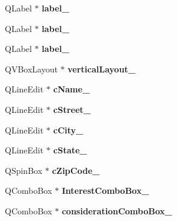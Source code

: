 \begin{DoxyCompactItemize}
Q\+Label $\ast$ {\bfseries label\+\_}
\item 
\mbox{\label{class_ui___main_window_ac1cbc41e9dbaeb3d0bdc2189d8e9ee1d}} 
Q\+Label $\ast$ {\bfseries label\+\_}
\item 
\mbox{\label{class_ui___main_window_a882200d8ae16962f5dd3b749ebacbf7e}} 
Q\+Label $\ast$ {\bfseries label\+\_}
\item 
\mbox{\label{class_ui___main_window_afcc20a3d5058037a00cdc6122f231848}} 
Q\+V\+Box\+Layout $\ast$ {\bfseries vertical\+Layout\+\_}
\item 
\mbox{\label{class_ui___main_window_a9a70e56f3f3a41b45871579bf0183f14}} 
Q\+Line\+Edit $\ast$ {\bfseries c\+Name\+\_}
\item 
\mbox{\label{class_ui___main_window_a7b67a1664ba294396c851565bb1c247c}} 
Q\+Line\+Edit $\ast$ {\bfseries c\+Street\+\_}
\item 
\mbox{\label{class_ui___main_window_a97860074e1ee4617de65ffca839e30e4}} 
Q\+Line\+Edit $\ast$ {\bfseries c\+City\+\_}
\item 
\mbox{\label{class_ui___main_window_ac2ee24b214782f40912f859f1e87b4f6}} 
Q\+Line\+Edit $\ast$ {\bfseries c\+State\+\_}
\item 
\mbox{\label{class_ui___main_window_a987987023a94b8ae38924f08bc3f4b03}} 
Q\+Spin\+Box $\ast$ {\bfseries c\+Zip\+Code\+\_}
\item 
\mbox{\label{class_ui___main_window_a673af35ada1b4e455533baa327ff7aed}} 
Q\+Combo\+Box $\ast$ {\bfseries Interest\+Combo\+Box\+\_}
\item 
\mbox{\label{class_ui___main_window_a27d5334a330bd73370eea70beed090a5}} 
Q\+Combo\+Box $\ast$ {\bfseries consideration\+Combo\+Box\+\_}
\item 
\mbox{\label{class_ui___main_window_aed12e55104b784f57839056255d3df70}} 

\end{DoxyCompactItemize}

